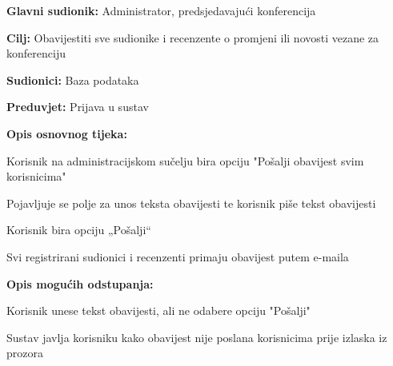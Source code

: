 					\noindent {}
					\begin{packed_item}
						\item \textbf{Glavni sudionik:} Administrator, predsjedavajući konferencija
						\item \textbf{Cilj:} Obavijestiti sve sudionike i recenzente o promjeni ili novosti vezane za konferenciju
						\item \textbf{Sudionici:} Baza podataka
						\item \textbf{Preduvjet:} Prijava u sustav
						
						\item \textbf{Opis osnovnog tijeka:} 
						\item[] \begin{packed_enum}
							\item Korisnik na administracijskom sučelju bira opciju "Pošalji obavijest svim korisnicima"
							\item Pojavljuje se polje za unos teksta obavijesti te korisnik piše tekst obavijesti
							\item Korisnik bira opciju „Pošalji“
							\item Svi registrirani sudionici i recenzenti primaju obavijest putem e-maila
						\end{packed_enum}
					
						\item \textbf{Opis mogućih odstupanja:}
						\item[] \begin{packed_enum}

							\item[2.a] Korisnik unese tekst obavijesti, ali ne odabere opciju "Pošalji"
							\item[] \begin{packed_enum}
								\item[1.] Sustav javlja korisniku kako obavijest nije poslana korisnicima prije izlaska iz prozora
							\end{packed_enum}
							
						\end{packed_enum}
					\end{packed_item}


